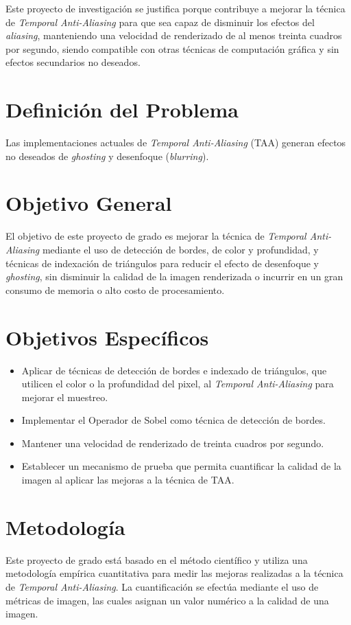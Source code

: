 \documentclass[pregrado]{tesis-usb} %
\begin{document}
Este proyecto de investigación se justifica porque contribuye a mejorar la técnica de \textit{Temporal Anti-Aliasing}  para que sea capaz de disminuir los efectos del \textit{aliasing}, manteniendo una velocidad de renderizado de al menos treinta cuadros por segundo, siendo compatible con otras técnicas de computación gráfica y sin efectos secundarios no deseados.


\section{Definición del Problema}
Las implementaciones actuales de \textit{Temporal Anti-Aliasing} (TAA) generan efectos no deseados de \textit{ghosting} y desenfoque (\textit{blurring}).

\section{Objetivo General}
El objetivo de este proyecto de grado es mejorar la técnica de \textit{Temporal Anti-Aliasing} mediante el uso de detección de bordes, de color y profundidad, y técnicas de indexación de triángulos para reducir el efecto de desenfoque y \textit{ghosting}, sin disminuir la calidad de la imagen renderizada o incurrir en un gran consumo de memoria o alto costo de procesamiento.

\section{Objetivos Específicos}
\begin{itemize}
	\item Aplicar de técnicas de detección de bordes e indexado de triángulos, que utilicen el color o la profundidad del pixel, al \textit{Temporal Anti-Aliasing} para mejorar el muestreo.
	\item Implementar el Operador de Sobel como técnica de detección de bordes.
	\item Mantener una velocidad de renderizado de treinta cuadros por segundo.
	\item Establecer un mecanismo de prueba que permita cuantificar la calidad de la imagen al aplicar las mejoras a la técnica de TAA. 
\end{itemize}

\section{Metodología}
Este proyecto de grado está basado en el método científico y utiliza una metodología empírica cuantitativa para medir las mejoras realizadas a la técnica de \textit{Temporal Anti-Aliasing}. La cuantificación se efectúa mediante el uso de métricas de imagen, las cuales asignan un valor numérico a la calidad de una imagen.
\end{document}
